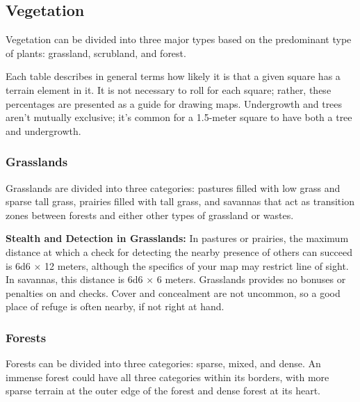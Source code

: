 \subsection{Vegetation}
Vegetation can be divided into three major types based on the predominant type of plants: grassland, scrubland, and forest.

Each table describes in general terms how likely it is that a given square has a terrain element in it. It is not necessary to roll for each square; rather, these percentages are presented as a guide for drawing maps. Undergrowth and trees aren't mutually exclusive; it's common for a 1.5-meter square to have both a tree and undergrowth.


\subsubsection{Grasslands}
Grasslands are divided into three categories: pastures filled with low grass and sparse tall grass, prairies filled with tall grass, and savannas that act as transition zones between forests and either other types of grassland or wastes.


\textbf{Stealth and Detection in Grasslands:} In pastures or prairies, the maximum distance at which a  check for detecting the nearby presence of others can succeed is 6d6 $\times$ 12 meters, although the specifics of your map may restrict line of sight. In savannas, this distance is 6d6 $\times$ 6 meters. Grasslands provides no bonuses or penalties on  and  checks. Cover and concealment are not uncommon, so a good place of refuge is often nearby, if not right at hand.

\subsubsection{Forests}
Forests can be divided into three categories: sparse, mixed, and dense. An immense forest could have all three categories within its borders, with more sparse terrain at the outer edge of the forest and dense forest at its heart.


